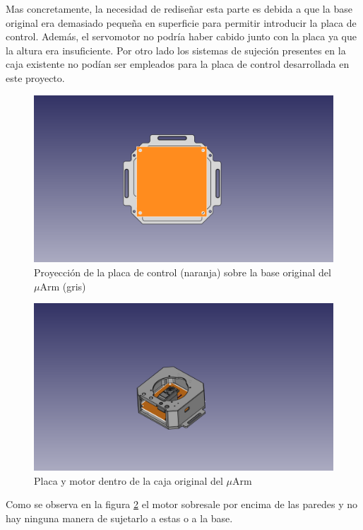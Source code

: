 Mas concretamente, la necesidad de rediseñar esta parte es debida a que la base original era demasiado pequeña en superficie para permitir introducir la placa de control. Además, el servomotor no podría haber cabido junto con la placa ya que la altura era insuficiente. Por otro lado los sistemas de sujeción presentes en la caja existente no podían ser empleados para la placa de control desarrollada en este proyecto.
 
 \begin{figure}[H]
    \centering
    \includegraphics[width=.9\linewidth]{pictures/PlacaYBase.png}
    \caption{Proyección de la placa de control (naranja) sobre la base original del $\mu$Arm (gris)}
    \label{fig:placa_y_base_antiguas}
\end{figure}


 \begin{figure}[H]
    \centering
    \includegraphics[width=.9\linewidth]{pictures/PlacaMotorYParedes1.png}
    \caption{Placa y motor dentro de la caja original del $\mu$Arm}
    \label{fig:placa_motor_y_paredes1}
\end{figure}

Como se observa en la figura \ref{fig:placa_motor_y_paredes1} el motor sobresale por encima de las paredes y no hay ninguna manera de sujetarlo a estas o a la base.

